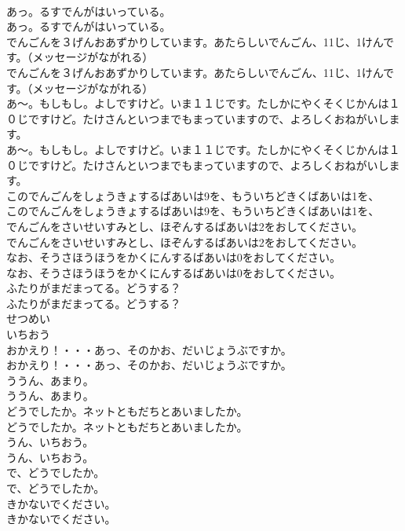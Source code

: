 \documentclass[8pt]{extreport}
\begin{document}
\begin{CJK}{UTF8}{min}
\\	あっ。るすでんがはいっている。	
\\	あっ。るすでんがはいっている。 
\\	でんごんを３げんおあずかりしています。あたらしいでんごん、11じ、1けんです。（メッセージがながれる）	
\\	でんごんを３げんおあずかりしています。あたらしいでんごん、11じ、1けんです。（メッセージがながれる） 
\\	あ〜。もしもし。よしですけど。いま１１じです。たしかにやくそくじかんは１０じですけど。たけさんといつまでもまっていますので、よろしくおねがいします。	
\\	あ〜。もしもし。よしですけど。いま１１じです。たしかにやくそくじかんは１０じですけど。たけさんといつまでもまっていますので、よろしくおねがいします。 
\\	このでんごんをしょうきょするばあいは9を、もういちどきくばあいは1を、	
\\	このでんごんをしょうきょするばあいは9を、もういちどきくばあいは1を、 
\\	でんごんをさいせいすみとし、ほぞんするばあいは2をおしてください。	
\\	でんごんをさいせいすみとし、ほぞんするばあいは2をおしてください。 
\\	なお、そうさほうほうをかくにんするばあいは0をおしてください。	
\\	なお、そうさほうほうをかくにんするばあいは0をおしてください。 
\\	ふたりがまだまってる。どうする？	
\\	ふたりがまだまってる。どうする？ 
\\	せつめい
\\	いちおう
\\	おかえり！・・・あっ、そのかお、だいじょうぶですか。	
\\	おかえり！・・・あっ、そのかお、だいじょうぶですか。 
\\	ううん、あまり。	
\\	ううん、あまり。 
\\	どうでしたか。ネットともだちとあいましたか。	
\\	どうでしたか。ネットともだちとあいましたか。 
\\	うん、いちおう。	
\\	うん、いちおう。 
\\	で、どうでしたか。	
\\	で、どうでしたか。 
\\	きかないでください。	
\\	きかないでください。 

\end{CJK}
\end{document}
